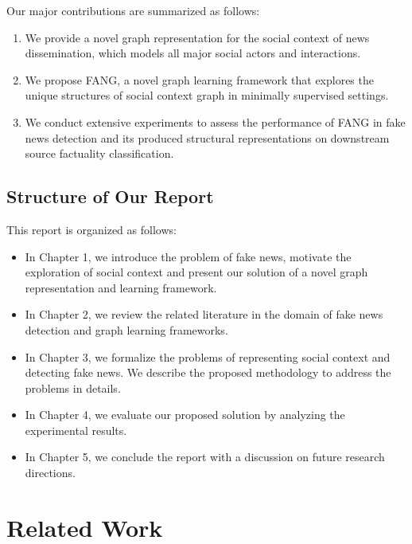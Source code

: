 \documentclass[fyp]{socreport}
\theoremstyle{definition}
\theoremstyle{hypothesis}
\begin{document}
Our major contributions are summarized as follows:
\begin{enumerate}
    \item We provide a novel graph representation for the social context of news dissemination, which models all major social actors and interactions.
    \item We propose FANG, a novel graph learning framework that explores the unique structures of social context graph in minimally supervised settings.
    \item We conduct extensive experiments to assess the performance of FANG in fake news detection and its produced structural representations on downstream source factuality classification.
\end{enumerate}

\section{Structure of Our Report}
This report is organized as follows: 
\begin{itemize}
    \item In Chapter 1, we introduce the problem of fake news, motivate the exploration of social context and present our solution of a novel graph representation and learning framework.
    \item In Chapter 2, we review the related literature in the domain of fake news detection and graph learning frameworks.
    \item In Chapter 3, we formalize the problems of representing social context and detecting fake news. We describe the proposed methodology to address the problems in details.
    \item In Chapter 4, we evaluate our proposed solution by analyzing the experimental results.
    \item In Chapter 5, we conclude the report with a discussion on future research directions.
\end{itemize}

\chapter{Related Work}
\label{ch:related}
\end{document}
